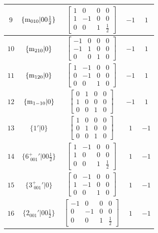 \documentclass[fleqn,8pt]{jsarticle}
\begin{document}
\begin{longtable}{ccccc}
$ 9 $ & $ \{{\rm m}_{010}|0 0 \frac{1}{2}\} $ & $ \begin{bmatrix} 1 & 0 & 0 & 0 \\ 1 & -1 & 0 & 0 \\ 0 & 0 & 1 & \frac{1}{2} \end{bmatrix} $ & $ -1 $ & $ 1 $ \\ \hline
$ 10 $ & $ \{{\rm m}_{210}|0\} $ & $ \begin{bmatrix} -1 & 0 & 0 & 0 \\ -1 & 1 & 0 & 0 \\ 0 & 0 & 1 & 0 \end{bmatrix} $ & $ -1 $ & $ 1 $ \\ \hline
$ 11 $ & $ \{{\rm m}_{120}|0\} $ & $ \begin{bmatrix} 1 & -1 & 0 & 0 \\ 0 & -1 & 0 & 0 \\ 0 & 0 & 1 & 0 \end{bmatrix} $ & $ -1 $ & $ 1 $ \\ \hline
$ 12 $ & $ \{{\rm m}_{1-10}|0\} $ & $ \begin{bmatrix} 0 & 1 & 0 & 0 \\ 1 & 0 & 0 & 0 \\ 0 & 0 & 1 & 0 \end{bmatrix} $ & $ -1 $ & $ 1 $ \\ \hline
$ 13 $ & $ \{1{}'|0\} $ & $ \begin{bmatrix} 1 & 0 & 0 & 0 \\ 0 & 1 & 0 & 0 \\ 0 & 0 & 1 & 0 \end{bmatrix} $ & $ 1 $ & $ -1 $ \\ \hline
$ 14 $ & $ \{6^{+}_{\,\,001}{}'|0 0 \frac{1}{2}\} $ & $ \begin{bmatrix} 1 & -1 & 0 & 0 \\ 1 & 0 & 0 & 0 \\ 0 & 0 & 1 & \frac{1}{2} \end{bmatrix} $ & $ 1 $ & $ -1 $ \\ \hline
$ 15 $ & $ \{3^{+}_{\,\,001}{}'|0\} $ & $ \begin{bmatrix} 0 & -1 & 0 & 0 \\ 1 & -1 & 0 & 0 \\ 0 & 0 & 1 & 0 \end{bmatrix} $ & $ 1 $ & $ -1 $ \\ \hline
$ 16 $ & $ \{2{}_{001}{}'|0 0 \frac{1}{2}\} $ & $ \begin{bmatrix} -1 & 0 & 0 & 0 \\ 0 & -1 & 0 & 0 \\ 0 & 0 & 1 & \frac{1}{2} \end{bmatrix} $ & $ 1 $ & $ -1 $ \\ \hline

\end{longtable}
\end{document}
